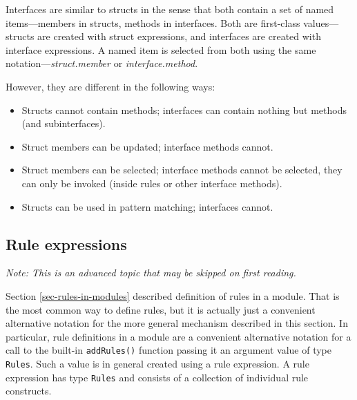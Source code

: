 \documentclass[twoside,letterpaper]{article}
\newcommand{\te}[1]{\texttt{#1}}
\begin{document}
Interfaces are similar to structs in the sense that both contain a set
of named items---members in structs, methods in interfaces.  Both are
first-class values---structs are created with struct expressions, and
interfaces are created with interface expressions.  A named item is
selected from both using the same notation---\emph{struct.member} or
\emph{interface.method}.

However, they are different in the following ways:
\begin{itemize}

\item
Structs cannot contain methods; interfaces can contain nothing but
methods (and subinterfaces).

\item
Struct members can be updated; interface methods cannot.

\item
Struct members can be selected; interface methods cannot be selected,
they can only be invoked (inside rules or other interface methods).

\item
Structs can be used in pattern matching; interfaces cannot.

\end{itemize}


\subsection{Rule expressions}

\label{sec-rule-exprs}


\emph{Note: This is an advanced topic that may be skipped on first reading.}

Section \ref{sec-rules-in-modules} described definition of rules in a
module.  That is the most common way to define rules, but it is
actually just a convenient alternative notation for the more general
mechanism described in this section.  In particular, rule definitions
in a module are a convenient alternative notation for a call to the
built-in \texttt{addRules()} function passing it an argument value of
type \texttt{Rules}.  Such a value is in general created using a rule
expression.  A rule expression has type \texttt{Rules}
\index{rules@\te{Rules} (type)}
and consists of a collection of individual rule constructs.
\end{document}
